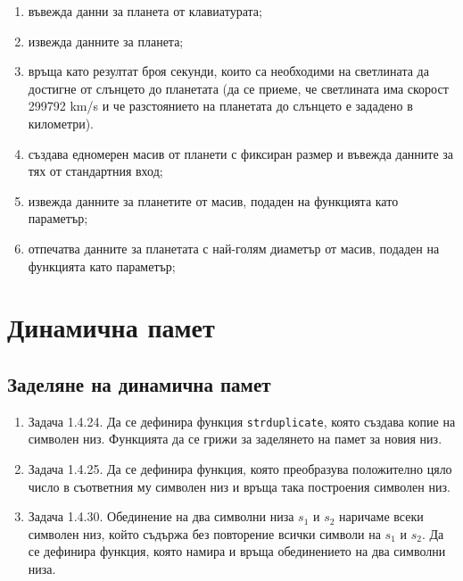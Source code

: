 {\begin{enumerate}
	\begin{enumerate}[label=\alph*)]%
		\item въвежда данни за планета от клавиатурата;
		\item извежда данните за планета;
		\item  връща като резултат броя секунди, които са необходими на светлината да достигне от слънцето до планетата (да се приеме, че светлината има скорост 299792 km/s и че разстоянието на планетата до слънцето е зададено в километри).
		\item създава едномерен масив от планети с фиксиран размер и въвежда данните за тях от стандартния вход;
		\item извежда данните за планетите от масив, подаден на функцията като параметър;
		\item отпечатва данните за планетата с най-голям диаметър от масив, подаден на функцията като параметър;
	\end{enumerate}


\end{enumerate}

\pagebreak

\clearpage\section {Динамична памет}

\subsection {Заделяне на динамична памет}

\begin{enumerate}


\item Задача 1.4.24. \cite{sbornik} Да се дефинира функция \texttt{strduplicate}, която създава копие на символен низ. Функцията да се грижи за заделянето на памет за новия низ.

\item Задача 1.4.25.  \cite{sbornik}  Да се дефинира функция, която преобразува положително цяло число в съответния му символен низ и връща така построения символен низ.

\item Задача 1.4.30.  \cite{sbornik}  Обединение на два символни низа $s_1$ и $s_2$ наричаме всеки символен низ, който съдържа без повторение всички символи на $s_1$ и $s_2$. Да се дефинира функция, която намира и връща обединението на два символни низа.


\end{enumerate}}
